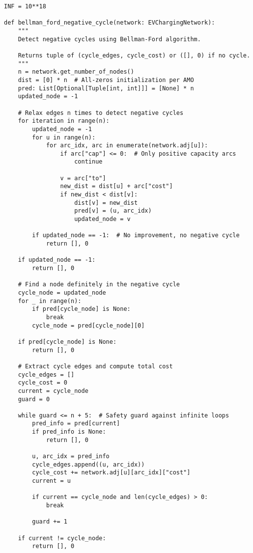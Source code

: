 \documentclass[12pt,a4paper]{article}
\begin{document}
\begin{lstlisting}[caption=Cycle-Canceling with Bellman-Ford]
INF = 10**18

def bellman_ford_negative_cycle(network: EVChargingNetwork):
    """
    Detect negative cycles using Bellman-Ford algorithm.
    
    Returns tuple of (cycle_edges, cycle_cost) or ([], 0) if no cycle.
    """
    n = network.get_number_of_nodes()
    dist = [0] * n  # All-zeros initialization per AMO
    pred: List[Optional[Tuple[int, int]]] = [None] * n
    updated_node = -1
    
    # Relax edges n times to detect negative cycles
    for iteration in range(n):
        updated_node = -1
        for u in range(n):
            for arc_idx, arc in enumerate(network.adj[u]):
                if arc["cap"] <= 0:  # Only positive capacity arcs
                    continue
                    
                v = arc["to"]
                new_dist = dist[u] + arc["cost"]
                if new_dist < dist[v]:
                    dist[v] = new_dist
                    pred[v] = (u, arc_idx)
                    updated_node = v
        
        if updated_node == -1:  # No improvement, no negative cycle
            return [], 0
    
    if updated_node == -1:
        return [], 0
    
    # Find a node definitely in the negative cycle
    cycle_node = updated_node
    for _ in range(n):
        if pred[cycle_node] is None:
            break
        cycle_node = pred[cycle_node][0]
    
    if pred[cycle_node] is None:
        return [], 0
    
    # Extract cycle edges and compute total cost
    cycle_edges = []
    cycle_cost = 0
    current = cycle_node
    guard = 0
    
    while guard <= n + 5:  # Safety guard against infinite loops
        pred_info = pred[current]
        if pred_info is None:
            return [], 0
        
        u, arc_idx = pred_info
        cycle_edges.append((u, arc_idx))
        cycle_cost += network.adj[u][arc_idx]["cost"]
        current = u
        
        if current == cycle_node and len(cycle_edges) > 0:
            break
        
        guard += 1
    
    if current != cycle_node:
        return [], 0
    

\end{lstlisting}
\end{document}
